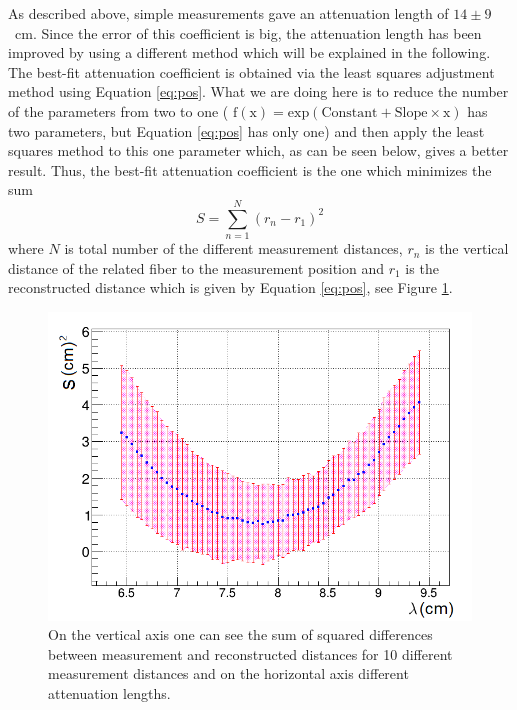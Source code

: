 \documentclass[a4paper]{article}\linespread{1.4}
\begin{document}
As described above, simple measurements gave an attenuation length of $14 \pm 9$~cm. Since the error of this coefficient is big, the attenuation length has been improved by using a different method which will be explained in the following.
\\The best-fit attenuation coefficient is obtained via the least squares adjustment method using Equation \ref{eq:pos}. What we are doing here is to reduce the number of the parameters from two to one ( $\mathrm{f(x) = exp(Constant + Slope\times x)}$ has two parameters, but Equation \ref{eq:pos} has only one) and then apply the least squares method to this one parameter which, as can be seen below, gives a better result.
Thus, the best-fit attenuation coefficient is the one which minimizes the sum
\begin{equation} S=\sum_{n=1}^{N} (r_{n}-r_{1})^{2} \end{equation}
where $N$ is total number of the different measurement distances, $r_{n}$ is the vertical distance of the related fiber to the measurement position 
and $r_{1}$ is the reconstructed distance which is given by Equation \ref{eq:pos}, see Figure \ref{fig:sums}.
\begin{figure}[] \hspace*{-0.7cm} \includegraphics[width=130mm,scale=2.0]{figures/exx.png} \caption {On the vertical axis one can see the
sum of squared differences between measurement and reconstructed distances for 10 different measurement distances and on the horizontal axis different attenuation lengths.} \label{fig:sums} \end{figure}
\end{document}
